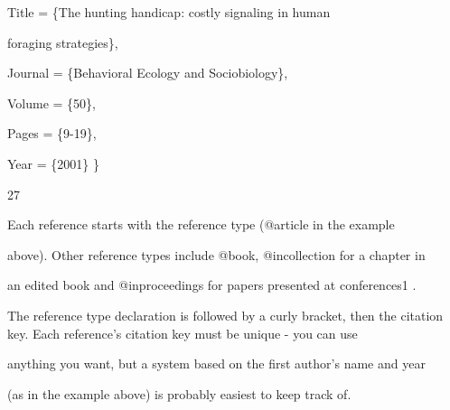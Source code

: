 \documentclass[a4paper,portrait,12pt]{article}
\begin{document}
\begin{flushleft}
Title = \{The hunting handicap: costly signaling in human
\end{flushleft}


\begin{flushleft}
foraging strategies\},
\end{flushleft}


\begin{flushleft}
Journal = \{Behavioral Ecology and Sociobiology\},
\end{flushleft}


\begin{flushleft}
Volume = \{50\},
\end{flushleft}


\begin{flushleft}
Pages = \{9-19\},
\end{flushleft}


\begin{flushleft}
Year = \{2001\} \}
\end{flushleft}


27





\begin{flushleft}
\newpage
Each reference starts with the reference type (@article in the example
\end{flushleft}


\begin{flushleft}
above). Other reference types include @book, @incollection for a chapter in
\end{flushleft}


\begin{flushleft}
an edited book and @inproceedings for papers presented at conferences1 .
\end{flushleft}


\begin{flushleft}
The reference type declaration is followed by a curly bracket, then the citation key. Each reference's citation key must be unique - you can use
\end{flushleft}


\begin{flushleft}
anything you want, but a system based on the first author's name and year
\end{flushleft}


\begin{flushleft}
(as in the example above) is probably easiest to keep track of.
\end{flushleft}
\end{document}
